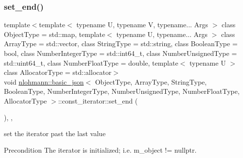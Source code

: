 \subsubsection{\texorpdfstring{set\+\_\+end()}{set\_end()}}
{\footnotesize\ttfamily template$<$template$<$ typename U, typename V, typename... Args $>$ class Object\+Type = std\+::map, template$<$ typename U, typename... Args $>$ class Array\+Type = std\+::vector, class String\+Type  = std\+::string, class Boolean\+Type  = bool, class Number\+Integer\+Type  = std\+::int64\+\_\+t, class Number\+Unsigned\+Type  = std\+::uint64\+\_\+t, class Number\+Float\+Type  = double, template$<$ typename U $>$ class Allocator\+Type = std\+::allocator$>$ \\
void \hyperlink{classnlohmann_1_1basic__json}{nlohmann\+::basic\+\_\+json}$<$ Object\+Type, Array\+Type, String\+Type, Boolean\+Type, Number\+Integer\+Type, Number\+Unsigned\+Type, Number\+Float\+Type, Allocator\+Type $>$\+::const\+\_\+iterator\+::set\+\_\+end (\begin{DoxyParamCaption}{ }\end{DoxyParamCaption})\hspace{0.3cm}{\ttfamily [inline]}, {\ttfamily [private]}, {\ttfamily [noexcept]}}



set the iterator past the last value 

\begin{DoxyPrecond}{Precondition}
The iterator is initialized; i.\+e. {\ttfamily m\+\_\+object != nullptr}. 
\end{DoxyPrecond}
\hypertarget{classnlohmann_1_1basic__json_1_1const__iterator_a0f42e99f14ac0a46456cf96fb384f290}{}\label{classnlohmann_1_1basic__json_1_1const__iterator_a0f42e99f14ac0a46456cf96fb384f290} 
